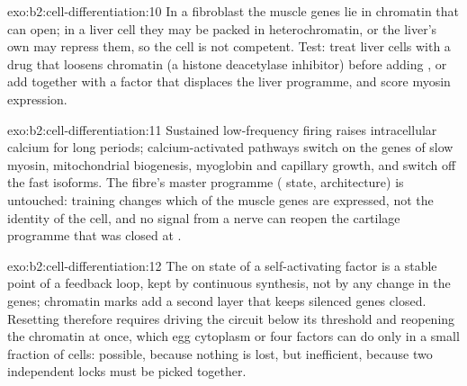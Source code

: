 \begin{solution}{exo:b2:cell-differentiation:10}
In a fibroblast the muscle genes lie in chromatin that  can
open; in a liver cell they may be packed in heterochromatin, or the
liver's own  may repress them, so the cell is not
competent. Test: treat liver cells with a drug that loosens
chromatin (a histone deacetylase inhibitor) before adding , or
add  together with a factor that displaces the liver
programme, and score myosin expression.
\end{solution}

\begin{solution}{exo:b2:cell-differentiation:11}
Sustained low-frequency firing raises intracellular calcium for
long periods; calcium-activated pathways switch on the genes of
slow myosin, mitochondrial biogenesis, myoglobin and capillary
growth, and switch off the fast isoforms. The fibre's master
programme ( state,  architecture) is untouched:
training changes which of the muscle genes are expressed, not the
identity of the cell, and no signal from a nerve can reopen the
cartilage programme that was closed at .
\end{solution}

\begin{solution}{exo:b2:cell-differentiation:12}
The on state of a self-activating factor is a stable point of a
feedback loop, kept by continuous synthesis, not by any change in
the genes; chromatin marks add a second layer that keeps silenced
genes closed. Resetting therefore requires driving the circuit
below its threshold and reopening the chromatin at once, which egg
cytoplasm or four factors can do only in a small fraction of
cells: possible, because nothing is lost, but inefficient, because
two independent locks must be picked together.
\end{solution}

